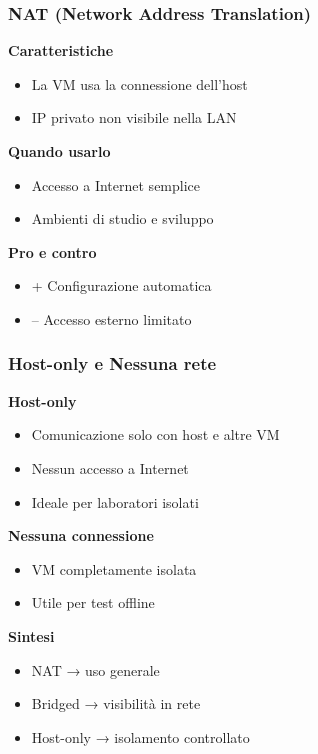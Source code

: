 \documentclass{beamer}
\begin{document}
	
	\begin{frame}
		\frametitle{NAT (Network Address Translation)}
		
		\textbf{Caratteristiche}
		\begin{itemize}
			\item La VM usa la connessione dell'host
			\item IP privato non visibile nella LAN
		\end{itemize}
		
		\vspace{0.4cm}
		
		\textbf{Quando usarlo}
		\begin{itemize}
			\item Accesso a Internet semplice
			\item Ambienti di studio e sviluppo
		\end{itemize}
		
		\vspace{0.4cm}
		
		\textbf{Pro e contro}
		\begin{itemize}
			\item + Configurazione automatica
			\item -- Accesso esterno limitato
		\end{itemize}
		
	\end{frame}
	
	
	\begin{frame}
		\frametitle{Host-only e Nessuna rete}
		
		\textbf{Host-only}
		\begin{itemize}
			\item Comunicazione solo con host e altre VM
			\item Nessun accesso a Internet
			\item Ideale per laboratori isolati
		\end{itemize}
		
		\vspace{0.5cm}
		
		\textbf{Nessuna connessione}
		\begin{itemize}
			\item VM completamente isolata
			\item Utile per test offline
		\end{itemize}
		
		\vspace{0.5cm}
		
		\textbf{Sintesi}
		\begin{itemize}
			\item NAT → uso generale
			\item Bridged → visibilità in rete
			\item Host-only → isolamento controllato
		\end{itemize}
		
	\end{frame}
	
\end{document}
